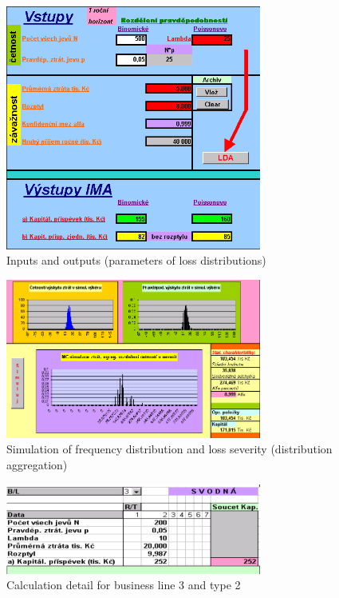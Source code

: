 \documentclass{article}
\begin{document}
\begin{figure}[H]
    \caption{Inputs and outputs (parameters of loss distributions)}
  \centering
    \includegraphics[width=0.75\textwidth]{vstup}

\end{figure}

\begin{figure}[H]
  \caption{Simulation of frequency distribution and loss severity (distribution aggregation)}
  \centering
    \includegraphics[width=0.75\textwidth]{simuluj}
\end{figure}

\begin{figure}[H]
  \caption{Calculation detail for business line 3 and type 2}
  \centering
    \includegraphics[width=0.75\textwidth]{tabulka}
\end{figure}
\end{document}
